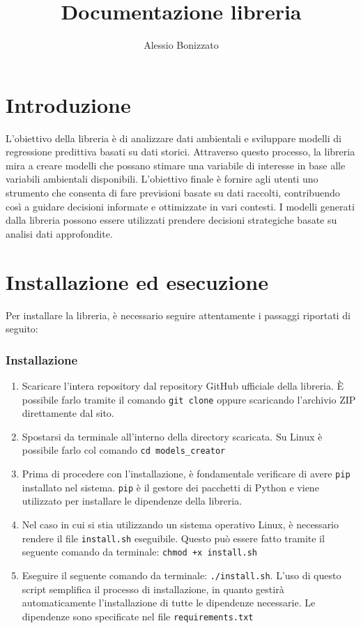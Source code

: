 \documentclass[a4paper,10pt]{article}
\newcommand{\rootDirectory}{models\_creator}
\begin{document}
\title{Documentazione libreria}
\author{Alessio Bonizzato}
\date{}
\maketitle

\newpage
\tableofcontents
\newpage
\section{Introduzione}
L'obiettivo della libreria è di analizzare dati ambientali e sviluppare modelli di regressione predittiva basati su dati storici. 
Attraverso questo processo, la libreria mira a creare modelli che possano stimare una variabile di interesse in base alle variabili ambientali disponibili. 
L'obiettivo finale è fornire agli utenti uno strumento che consenta di fare previsioni basate su dati raccolti, contribuendo così a guidare decisioni informate 
e ottimizzate in vari contesti. I modelli generati dalla libreria possono essere utilizzati prendere decisioni strategiche basate su analisi dati approfondite.

\section{Installazione ed esecuzione}
Per installare la libreria, è necessario seguire attentamente i passaggi riportati di seguito:

\subsubsection*{Installazione}
\begin{enumerate}
  \item Scaricare l'intera repository dal repository GitHub ufficiale della libreria. 
  È possibile farlo tramite il comando \texttt{git clone} oppure scaricando l'archivio ZIP direttamente dal sito.
  \item Spostarsi da terminale all'interno della directory scaricata. Su Linux è possibile farlo col comando \texttt{cd \rootDirectory}
  \item Prima di procedere con l'installazione, è fondamentale verificare di avere \texttt{pip} installato nel sistema. 
  \texttt{pip} è il gestore dei pacchetti di Python e viene utilizzato per installare le dipendenze della libreria.
  \item Nel caso in cui si stia utilizzando un sistema operativo Linux, è necessario rendere il file \texttt{install.sh} eseguibile. 
  Questo può essere fatto tramite il seguente comando da terminale: \texttt{chmod +x install.sh}
  \item Eseguire il seguente comando da terminale: \texttt{./install.sh}. L'uso di questo script semplifica il processo di installazione, 
  in quanto gestirà automaticamente l'installazione di tutte le dipendenze necessarie. Le dipendenze sono specificate nel file \texttt{requirements.txt}
\end{enumerate}
\end{document}
